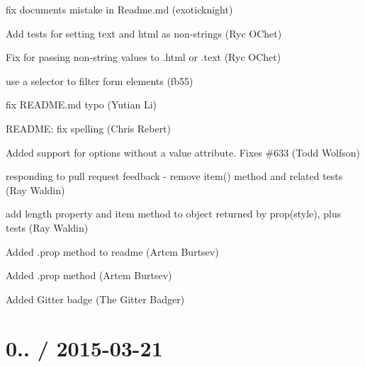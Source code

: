 \begin{DoxyItemize}
\item fix document\textquotesingle{}s mistake in Readme.\+md (exoticknight)
\item Add tests for setting text and html as non-\/strings (Ryc O\textquotesingle{}Chet)
\item Fix for passing non-\/string values to .html or .text (Ryc O\textquotesingle{}Chet)
\item use a selector to filter form elements (fb55)
\item fix R\+E\+A\+D\+M\+E.\+md typo (Yutian Li)
\item R\+E\+A\+D\+ME\+: fix spelling (Chris Rebert)
\item Added support for options without a {\ttfamily value} attribute. Fixes \#633 (Todd Wolfson)
\item responding to pull request feedback -\/ remove item() method and related tests (Ray Waldin)
\item add length property and item method to object returned by prop(\textquotesingle{}style\textquotesingle{}), plus tests (Ray Waldin)
\item Added .prop method to readme (Artem Burtsev)
\item Added .prop method (Artem Burtsev)
\item Added Gitter badge (The Gitter Badger)
\end{DoxyItemize}

\section*{0.. / 2015-\/03-\/21 }


